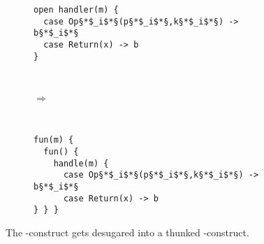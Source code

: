 \begin{figure}[h]
    \centering
    \begin{subfigure}[c]{0.45\textwidth}
        \centering
\begin{lstlisting}[style=links]
open handler(m) {
  case Op§*$_i$*§(p§*$_i$*§,k§*$_i$*§) -> b§*$_i$*§
  case Return(x) -> b
}
\end{lstlisting}        
    \end{subfigure}%
    ~ 
    \begin{subfigure}[c]{0.1\textwidth}
      $\Rightarrow$
    \end{subfigure}%
    ~
    \begin{subfigure}[c]{0.45\textwidth}
        \centering
\begin{lstlisting}[style=links]
fun(m) {
  fun() {
    handle(m) {
      case Op§*$_i$*§(p§*$_i$*§,k§*$_i$*§) -> b§*$_i$*§
      case Return(x) -> b
} } }
\end{lstlisting}       
    \end{subfigure}
\caption{The -construct gets desugared into a thunked -construct.}\label{fig:openhandler-desugar}
\end{figure}